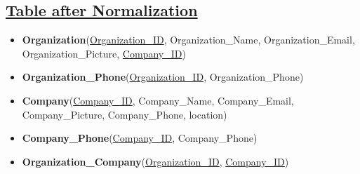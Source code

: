 \subsection*{\underline{Table after Normalization}}
\begin{itemize}
    \item \textbf{Organization}(\underline{Organization\_ID}, Organization\_Name, Organization\_Email, Organization\_Picture, \underline{Company\_ID})
    \item \textbf{Organization\_Phone}(\underline{Organization\_ID}, Organization\_Phone)
    \item \textbf{Company}(\underline{Company\_ID}, Company\_Name, Company\_Email, Company\_Picture, Company\_Phone, location)
    \item \textbf{Company\_Phone}(\underline{Company\_ID}, Company\_Phone)
    \item \textbf{Organization\_Company}(\underline{Organization\_ID}, \underline{Company\_ID})
\end{itemize}



\clearpage
